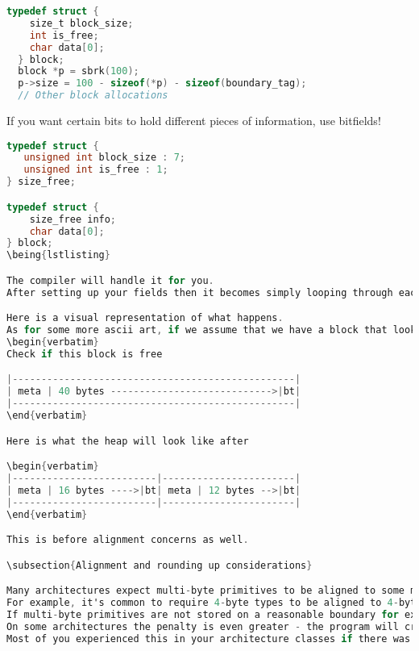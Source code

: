 \begin{lstlisting}[language=C]
  typedef struct {
    size_t block_size;
    int is_free;
    char data[0];
  } block;
  block *p = sbrk(100);
  p->size = 100 - sizeof(*p) - sizeof(boundary_tag);
  // Other block allocations
\end{lstlisting}

If you want certain bits to hold different pieces of information, use bitfields!

\begin{lstlisting}[language=C]
typedef struct {
   unsigned int block_size : 7;
   unsigned int is_free : 1;
} size_free;

typedef struct {
    size_free info;
    char data[0];
} block;
\being{lstlisting}

The compiler will handle it for you.
After setting up your fields then it becomes simply looping through each of the blocks and checking the appropriate fields

Here is a visual representation of what happens.
As for some more ascii art, if we assume that we have a block that looks like this, we want to spit if the allocation is let's say 16 bytes
\begin{verbatim}
Check if this block is free

|-------------------------------------------------|
| meta | 40 bytes ---------------------------->|bt|
|-------------------------------------------------|
\end{verbatim}

Here is what the heap will look like after

\begin{verbatim}
|-------------------------|-----------------------|
| meta | 16 bytes ---->|bt| meta | 12 bytes -->|bt|
|-------------------------|-----------------------|
\end{verbatim}

This is before alignment concerns as well.

\subsection{Alignment and rounding up considerations}

Many architectures expect multi-byte primitives to be aligned to some multiple of 2 (4, 16, etc).
For example, it's common to require 4-byte types to be aligned to 4-byte boundaries and 8-byte types on 8-byte boundaries.
If multi-byte primitives are not stored on a reasonable boundary for example starting at an odd address then the performance can be significantly impacted because it may require two memory read requests instead of one.
On some architectures the penalty is even greater - the program will crash with a \href{http://en.wikipedia.org/wiki/Bus_error\#Unaligned_access}{bus error}.
Most of you experienced this in your architecture classes if there was no memory protection.


\end{lstlisting}
